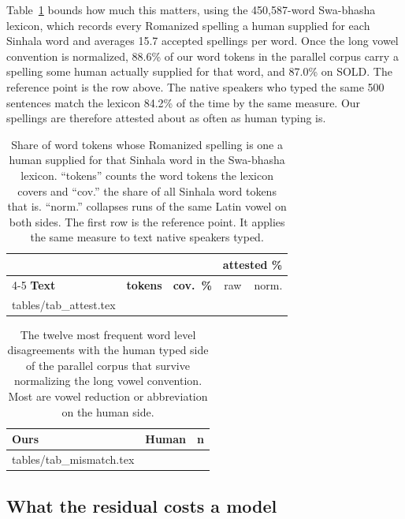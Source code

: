 \documentclass[11pt]{article}
\makeatletter
\newcommand{\rows}[1]{\@@input #1 }
\makeatother
\begin{document}
Table~\ref{tab:attest} bounds how much this matters, using the
450{,}587-word Swa-bhasha lexicon, which records every Romanized spelling a human
supplied for each Sinhala word and averages 15.7 accepted spellings per word.
Once the long vowel convention is normalized, 88.6\% of our word tokens in the
parallel corpus carry a spelling some human actually supplied for that word, and
87.0\% on SOLD. The reference point is the row above. The native speakers who typed
the same 500 sentences match the lexicon 84.2\% of the time by the same measure. Our
spellings are therefore attested about as often as human typing is.

\begin{table}[t]
\centering\footnotesize
\setlength{\tabcolsep}{2.4pt}
\begin{tabular}{@{}lrrrr@{}}
\toprule
& & & \multicolumn{2}{c}{\textbf{attested \%}} \\
\cmidrule(lr){4-5}
\textbf{Text} & \textbf{tokens} & \textbf{cov.\ \%} & raw & norm. \\
\midrule
\rows{tables/tab_attest.tex}
\bottomrule
\end{tabular}
\caption{Share of word tokens whose Romanized spelling is one a human supplied
for that Sinhala word in the Swa-bhasha lexicon. ``tokens'' counts the word
tokens the lexicon covers and ``cov.'' the share of all Sinhala word tokens that
is. ``norm.'' collapses runs of the same Latin vowel on both sides. The first row
is the reference point. It applies the same measure to text native speakers
typed.}
\label{tab:attest}
\end{table}

\begin{table}[t]
\centering\small
\begin{tabular}{@{}llr@{}}
\toprule
\textbf{Ours} & \textbf{Human} & \textbf{n} \\
\midrule
\rows{tables/tab_mismatch.tex}
\bottomrule
\end{tabular}
\caption{The twelve most frequent word level disagreements with the human typed
side of the parallel corpus that survive normalizing the long vowel convention.
Most are vowel reduction or abbreviation on the human side.}
\label{tab:mismatch}
\end{table}

\subsection{What the residual costs a model}
\label{sec:translitbias}
\end{document}
